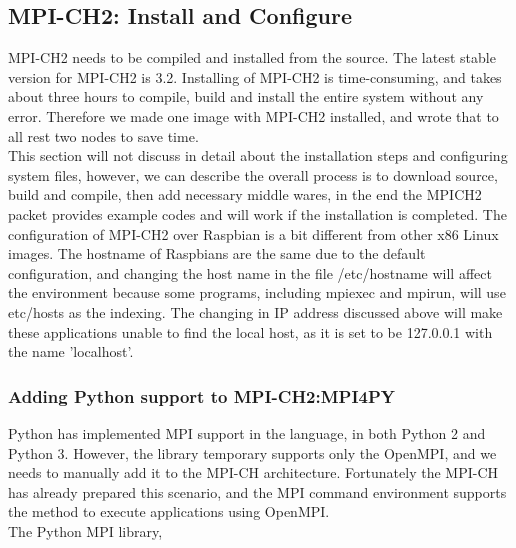 \documentclass[11pt,openright,a4paper]{report}
\begin{document}
\subsection{MPI-CH2: Install and Configure}
MPI-CH2 needs to be compiled and installed from the source. The latest stable version for MPI-CH2 is 3.2. Installing of MPI-CH2 is time-consuming, and takes about three hours to compile, build and install the entire system without any error. Therefore we made one image with MPI-CH2 installed, and wrote that to all rest two nodes to save time.\\
This section will not discuss in detail about the installation steps and configuring system files, however, we can describe the overall process is to download source, build and compile, then add necessary middle wares, in the end the MPICH2 packet provides example codes and will work if the installation is completed. The configuration of MPI-CH2 over Raspbian is a bit different from other x86 Linux images. The hostname of Raspbians are the same due to the default configuration, and changing the host name in the file /etc/hostname will affect the environment because some programs, including mpiexec and mpirun, will use etc/hosts as the indexing. The changing in IP address discussed above will make these applications unable to find the local host, as it is set to be 127.0.0.1 with the name 'localhost'.\\
\subsubsection{Adding Python support to MPI-CH2:MPI4PY}
Python has implemented MPI support in the language, in both Python 2 and Python 3\cite{mpi4py}. However, the library temporary supports only the OpenMPI, and we needs to manually add it to the MPI-CH architecture. Fortunately the MPI-CH has already prepared this scenario, and the MPI command environment supports the method  to execute applications using OpenMPI.\\
The Python MPI library, 
\end{document}
